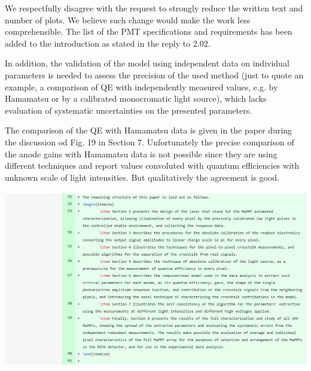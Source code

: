 \documentclass[11pt]{report}
\begin{document}
We respectfully disagree with the request to strongly reduce the written text and number of plots.
We believe such change would make the work less comprehensible.
The list of the PMT specifications and requirements has been added to the introduction as stated in the reply to 2.02.

\begin{tcolorbox}[enlarge top by=2em,colbacktitle=blue!60!white,colframe=black!80!white,left=0pt,right=0pt,top=0pt,bottom=0pt,boxrule=0.3pt,title=\bfseries2.12]
In addition, the validation of the model using independent data on individual parameters is needed to assess the precision of the used method (just to quote an example, a comparison of QE with independently measured values, e.g. by Hamamatsu or by a calibrated monocromatic light source), which lacks evaluation of systematic uncertainties on the presented parameters.
\end{tcolorbox}


The comparison of the QE with Hamamatsu data is given in the paper during the discussion od Fig. 19 in Section 7.
Unfortunately the precise comparison of the anode gains with Hamamatsu data is not possible since they are using different techniques and report values convoluted with quantum efficiencies with unknown scale of light intensities.
But qualitatively the agreement is good.



\clearpage




\begin{tcolorbox}[enlarge top by=2em,colbacktitle=red!60!white,colframe=black!80!white,left=0pt,right=0pt,top=0pt,bottom=0pt,boxrule=0.3pt,title=\bfseries Addition 1]
\end{tcolorbox}

\includegraphics[width=\linewidth]{round1/add1.png}
\end{document}
